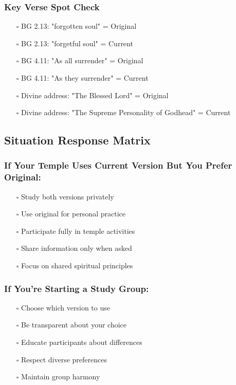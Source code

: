 \documentclass[11pt,twoside]{book}
\begin{document}
\subsubsection*{Key Verse Spot Check}
\label{sec:orgkeyverse}
\begin{itemize}
\item[$\square$] BG 2.13: "forgotten soul" = Original
\item[$\square$] BG 2.13: "forgetful soul" = Current
\item[$\square$] BG 4.11: "As all surrender" = Original
\item[$\square$] BG 4.11: "As they surrender" = Current
\item[$\square$] Divine address: "The Blessed Lord" = Original
\item[$\square$] Divine address: "The Supreme Personality of Godhead" = Current
\end{itemize}

\subsection*{Situation Response Matrix}
\label{sec:orgsituation}

\subsubsection*{If Your Temple Uses Current Version But You Prefer Original:}
\label{sec:orgtemple}
\begin{itemize}
\item[$\square$] Study both versions privately
\item[$\square$] Use original for personal practice
\item[$\square$] Participate fully in temple activities
\item[$\square$] Share information only when asked
\item[$\square$] Focus on shared spiritual principles
\end{itemize}

\subsubsection*{If You're Starting a Study Group:}
\label{sec:orgstudygroup}
\begin{itemize}
\item[$\square$] Choose which version to use
\item[$\square$] Be transparent about your choice
\item[$\square$] Educate participants about differences
\item[$\square$] Respect diverse preferences
\item[$\square$] Maintain group harmony
\end{itemize}
\end{document}
